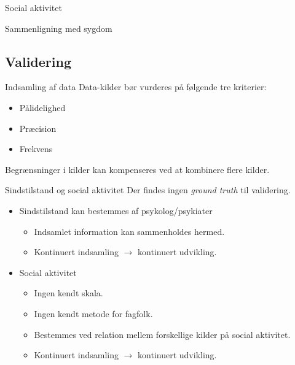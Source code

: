 \begin{frame}{Social aktivitet}
\end{frame}

\begin{frame}{Sammenligning med sygdom}
\end{frame}

\subsection{Validering}
\begin{frame}{Indsamling af data}
Data-kilder bør vurderes på følgende tre kriterier:
\begin{itemize}
\item Pålidelighed
\item Præcision
\item Frekvens
\end{itemize}
Begrænsninger i kilder kan kompenseres ved at kombinere flere kilder.
\end{frame}

\begin{frame}{Sindstilstand og social aktivitet}
Der findes ingen \textit{ground truth} til validering.
\begin{itemize}
\item Sindstilstand kan bestemmes af psykolog/psykiater
\begin{itemize}
\item Indsamlet information kan sammenholdes hermed.
\item Kontinuert indsamling $\rightarrow$ kontinuert udvikling.
\end{itemize}
\item Social aktivitet
\begin{itemize}
\item Ingen kendt skala.
\item Ingen kendt metode for fagfolk.
\item Bestemmes ved relation mellem forskellige kilder på social aktivitet.
\item Kontinuert indsamling $\rightarrow$ kontinuert udvikling.
\end{itemize}
\end{itemize}
\end{frame}

